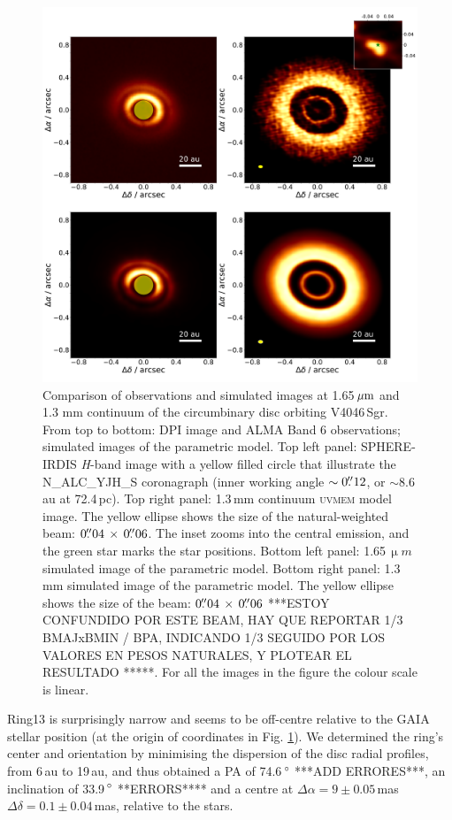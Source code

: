 \documentclass[letters,usenatbib,times]{mnras}
\begin{document}
\begin{figure}
  \includegraphics[width=\textwidth]{hot_two_E.pdf}
  \caption{Comparison of observations and simulated images at 1.65\,$\hbox{$\mu$m}$ and 1.3 mm continuum of the circumbinary disc orbiting V4046\,Sgr. From top to bottom: DPI image and ALMA Band 6 observations; simulated images of the parametric model. Top left panel: SPHERE-IRDIS \textit{H}-band image with a yellow filled circle that illustrate the N\_ALC\_YJH\_S coronagraph (inner working angle $\sim0\hbox{$.\!\!^{\prime\prime}$}12$, or $\sim$8.6\,au at 72.4\,pc). Top right panel: 1.3\,mm continuum \textsc{uvmem} model image. The yellow ellipse shows the size of the natural-weighted beam: $ 0\hbox{$.\!\!^{\prime\prime}$}04 \, \times \, 0\hbox{$.\!\!^{\prime\prime}$}06$. The inset zooms into  the central emission, and the green star marks the star positions. Bottom left panel: 1.65\,$\upmu m$ simulated image of the parametric model. Bottom right panel: 1.3\,mm simulated image of the parametric model. The yellow ellipse shows the size of the  beam: $ 0\hbox{$.\!\!^{\prime\prime}$}04 \, \times \, 0\hbox{$.\!\!^{\prime\prime}$}06$ ***ESTOY CONFUNDIDO POR ESTE BEAM, HAY QUE REPORTAR  1/3 BMAJxBMIN / BPA, INDICANDO 1/3 SEGUIDO POR LOS VALORES EN PESOS NATURALES, Y PLOTEAR EL RESULTADO *****. For all the images in the figure the colour scale is linear.}
  \label{fig:two}
\end{figure}

Ring13 is surprisingly narrow and seems to be off-centre relative to the GAIA stellar position (at the origin of coordinates in Fig. \ref{fig:two}). We determined the ring's center and orientation by  minimising  the dispersion of the disc radial profiles, from 6\,au to 19\,au, and thus obtained a  PA of 74.6\,$\hbox{$^\circ$}$ ***ADD ERRORES***, an inclination of 33.9\,$\hbox{$^\circ$}$ **ERRORS**** and a centre at $\Delta \alpha = 9\pm0.05$\,mas $\Delta \delta = 0.1\pm0.04$\,mas, relative to the stars.
\end{document}
